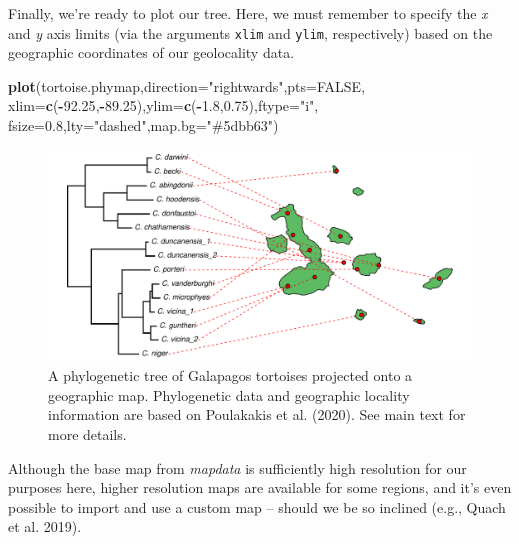 \documentclass[fleqn,10pt,lineno]{wlpeerj} %
\newenvironment{Shaded}{\begin{snugshade}}{\end{snugshade}}
\newcommand{\AttributeTok}[1]{\textcolor[rgb]{0.13,0.29,0.53}{#1}}
\newcommand{\ConstantTok}[1]{\textcolor[rgb]{0.56,0.35,0.01}{#1}}
\newcommand{\FloatTok}[1]{\textcolor[rgb]{0.00,0.00,0.81}{#1}}
\newcommand{\FunctionTok}[1]{\textcolor[rgb]{0.13,0.29,0.53}{\textbf{#1}}}
\newcommand{\NormalTok}[1]{#1}
\newcommand{\SpecialCharTok}[1]{\textcolor[rgb]{0.81,0.36,0.00}{\textbf{#1}}}
\newcommand{\StringTok}[1]{\textcolor[rgb]{0.31,0.60,0.02}{#1}}
\begin{document}
Finally, we're ready to plot our tree. Here, we must remember to specify the \emph{x} and \emph{y} axis limits (via the arguments \texttt{xlim} and \texttt{ylim}, respectively) based on the geographic coordinates of our geolocality data.

\begin{Shaded}
\begin{Highlighting}[]
\FunctionTok{plot}\NormalTok{(tortoise.phymap,}\AttributeTok{direction=}\StringTok{"rightwards"}\NormalTok{,}\AttributeTok{pts=}\ConstantTok{FALSE}\NormalTok{,}
  \AttributeTok{xlim=}\FunctionTok{c}\NormalTok{(}\SpecialCharTok{{-}}\FloatTok{92.25}\NormalTok{,}\SpecialCharTok{{-}}\FloatTok{89.25}\NormalTok{),}\AttributeTok{ylim=}\FunctionTok{c}\NormalTok{(}\SpecialCharTok{{-}}\FloatTok{1.8}\NormalTok{,}\FloatTok{0.75}\NormalTok{),}\AttributeTok{ftype=}\StringTok{"i"}\NormalTok{,}
  \AttributeTok{fsize=}\FloatTok{0.8}\NormalTok{,}\AttributeTok{lty=}\StringTok{"dashed"}\NormalTok{,}\AttributeTok{map.bg=}\StringTok{"\#5dbb63"}\NormalTok{)}
\end{Highlighting}
\end{Shaded}

\begin{figure}
\includegraphics[width=1\linewidth]{Revell.phytools-v2_peerj_files/figure-latex/tortoise-geog-1} \caption{A phylogenetic tree of Galapagos tortoises projected onto a geographic map. Phylogenetic data and geographic locality information are based on Poulakakis et al. (2020). See main text for more details.}\label{fig:tortoise-geog}
\end{figure}

Although the base map from \emph{mapdata} is sufficiently high resolution for our purposes here, higher resolution maps are available for some regions, and it's even possible to import and use a custom map -- should we be so inclined (e.g., Quach et al. 2019).
\end{document}
